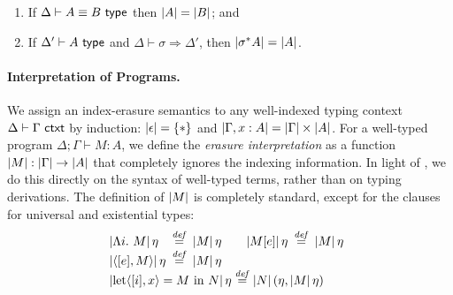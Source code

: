 \begin{lemma}\label{lem:tyeqsubst-erasure}
  \begin{enumerate}
  \item If $\Delta \vdash A \equiv B \textup{\textsf{ type}}$ then $\left| A\right| =
    \left| B\right|$; and
  \item If $\Delta' \vdash A \textup{\textsf{ type}}$ and $\Delta \vdash \sigma
    \Rightarrow \Delta'$, then $\left| \sigma^*A\right| = \left| A\right|$.
  \end{enumerate}
\end{lemma}

\paragraph{Interpretation of Programs.}


We assign an index-erasure semantics to any well-indexed typing
context $\Delta \vdash \Gamma \textup{\textsf{ ctxt}}$ by induction:
$\left| \epsilon\right| = \{*\}$ and $\left| \Gamma, x : A\right| =
\left| \Gamma\right| \times \left| A\right|$. For a well-typed program $\Delta;
\Gamma \vdash M : A$, we define the \emph{erasure interpretation} as a
function $\left| M\right| : \left| \Gamma\right| \to \left| A\right|$ that completely
ignores the indexing information. In light of
, we do this %
directly on the syntax of well-typed terms, rather than on typing
derivations. The definition of $\left| M\right|$ is completely standard,
except for the clauses for universal and existential types:
\begin{displaymath}
  \begin{array}{@{}l}
    \begin{array}{@{}l@{\hspace{0.5em}}c@{\hspace{0.5em}}l@{\hspace{2em}}l@{\hspace{0.5em}}c@{\hspace{0.5em}}l@{}}
      \tmSem{\Lambda i.\ M}\eta & \isDefinedAs & \tmSem{M}\eta
      &
      \tmSem{M[e]}\eta & \isDefinedAs & \tmSem{M}\eta \\
      \tmSem{\langle [e], M\rangle}\eta & \isDefinedAs & \tmSem{M}\eta
    \end{array} \\
    \tmSem{\mathrm{let}\langle[i], x\rangle = M\ \mathrm{in}\ N}\eta \isDefinedAs \tmSem{N}(\eta, \tmSem{M}\eta)
  \end{array}
\end{displaymath}


